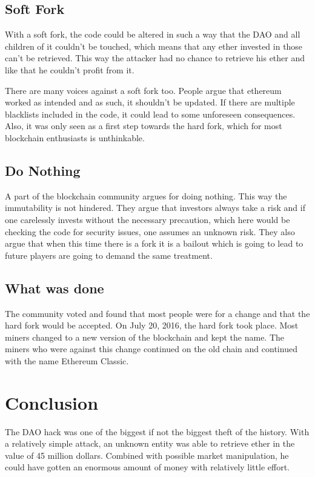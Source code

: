 \documentclass[a4paper, 11pt]{scrartcl}
\begin{document}
\subsection{Soft Fork}

With a soft fork, the code could be altered in such a way that the DAO and all children of it couldn't be touched, which means that any ether invested in those can't be retrieved. This way the attacker had no chance to retrieve his ether and like that he couldn't profit from it. \cite{understandingDAO}

There are many voices against a soft fork too. People argue that ethereum worked as intended and as such, it shouldn't be updated. If there are multiple blacklists included in the code, it could lead to some unforeseen consequences. Also, it was only seen as a first step towards the hard fork, which for most blockchain enthusiasts is unthinkable. \cite{understandingDAO}

\subsection{Do Nothing}

A part of the blockchain community argues for doing nothing. This way the immutability is not hindered. They argue that investors always take a risk and if one carelessly invests without the necessary precaution, which here would be checking the code for security issues, one assumes an unknown risk. They also argue that when this time there is a fork it is a bailout which is going to lead to future players are going to demand the same treatment. \cite{understandingDAO}

\subsection{What was done}

The community voted and found that most people were for a change and that the hard fork would be accepted. On July 20, 2016, the hard fork took place. Most miners changed to a new version of the blockchain and kept the name. The miners who were against this change continued on the old chain and continued with the name Ethereum Classic. \cite{fork}

\section{Conclusion}

The DAO hack was one of the biggest if not the biggest theft of the history. With a relatively simple attack, an unknown entity was able to retrieve ether in the value of 45 million dollars. Combined with possible market manipulation, he could have gotten an enormous amount of money with relatively little effort. 
\end{document}
